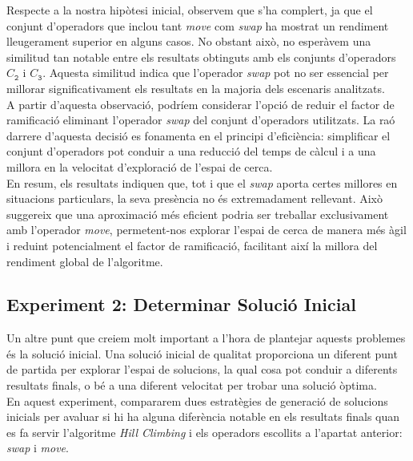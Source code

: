 \documentclass[a4paper]{article}
\begin{document}
	Respecte a la nostra hipòtesi inicial, observem que s'ha complert, ja que el conjunt d'operadors que inclou tant \textit{move} com \textit{swap} ha mostrat un rendiment lleugerament superior en alguns casos. No obstant això, no esperàvem una similitud tan notable entre els resultats obtinguts amb els conjunts d'operadors $C_{\texttt{2}}$ i $C_{\texttt{3}}$. Aquesta similitud indica que l'operador \textit{swap} pot no ser essencial per millorar significativament els resultats en la majoria dels escenaris analitzats. \\
	
	A partir d'aquesta observació, podríem considerar l'opció de reduir el factor de ramificació eliminant l'operador \textit{swap} del conjunt d'operadors utilitzats. La raó darrere d'aquesta decisió es fonamenta en el principi d'eficiència: simplificar el conjunt d'operadors pot conduir a una reducció del temps de càlcul i a una millora en la velocitat d'exploració de l'espai de cerca. \\
	
	En resum, els resultats indiquen que, tot i que el \textit{swap} aporta certes millores en situacions particulars, la seva presència no és extremadament rellevant. Això suggereix que una aproximació més eficient podria ser treballar exclusivament amb l'operador \textit{move}, permetent-nos explorar l'espai de cerca de manera més àgil i reduint potencialment el factor de ramificació, facilitant així la millora del rendiment global de l'algoritme. \\
	
	
	\subsection{Experiment 2: Determinar Solució Inicial}
	
	Un altre punt que creiem molt important a l'hora de plantejar aquests problemes és la solució inicial. Una solució inicial de qualitat proporciona un diferent punt de partida per explorar l'espai de solucions, la qual cosa pot conduir a diferents resultats finals, o bé a una diferent velocitat per trobar una solució òptima. \\
	
	En aquest experiment, compararem dues estratègies de generació de solucions inicials per avaluar si hi ha alguna diferència notable en els resultats finals quan es fa servir l'algoritme \textit{Hill Climbing} i els operadors escollits a l'apartat anterior: \textit{swap} i \textit{move}.\\
	
\end{document}
